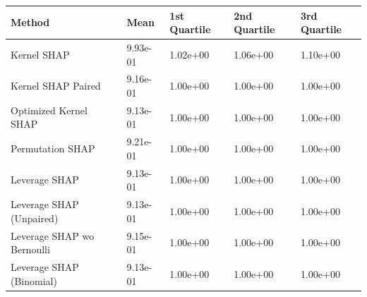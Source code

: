 \begin{tabular}{lllll}
  \toprule
  \textbf{Method} & \textbf{Mean} & \textbf{1st Quartile} & \textbf{2nd Quartile} & \textbf{3rd Quartile} \\ \midrule
Kernel SHAP & 9.93e-01 & 1.02e+00 & 1.06e+00 & 1.10e+00\\
Kernel SHAP Paired & 9.16e-01 & \cellcolor{gold!60}1.00e+00 & \cellcolor{gold!60}1.00e+00 & \cellcolor{gold!60}1.00e+00\\
Optimized Kernel SHAP & \cellcolor{gold!60}9.13e-01 & \cellcolor{gold!60}1.00e+00 & \cellcolor{gold!60}1.00e+00 & \cellcolor{gold!60}1.00e+00\\
Permutation SHAP & 9.21e-01 & \cellcolor{gold!60}1.00e+00 & \cellcolor{gold!60}1.00e+00 & \cellcolor{gold!60}1.00e+00\\
Leverage SHAP & \cellcolor{gold!60}9.13e-01 & \cellcolor{gold!60}1.00e+00 & \cellcolor{gold!60}1.00e+00 & \cellcolor{gold!60}1.00e+00\\
Leverage SHAP (Unpaired) & \cellcolor{gold!60}9.13e-01 & \cellcolor{gold!60}1.00e+00 & \cellcolor{gold!60}1.00e+00 & \cellcolor{gold!60}1.00e+00\\
Leverage SHAP wo Bernoulli & 9.15e-01 & \cellcolor{gold!60}1.00e+00 & \cellcolor{gold!60}1.00e+00 & \cellcolor{gold!60}1.00e+00\\
Leverage SHAP (Binomial) & \cellcolor{gold!60}9.13e-01 & \cellcolor{gold!60}1.00e+00 & \cellcolor{gold!60}1.00e+00 & \cellcolor{gold!60}1.00e+00\\
\bottomrule
\end{tabular}
